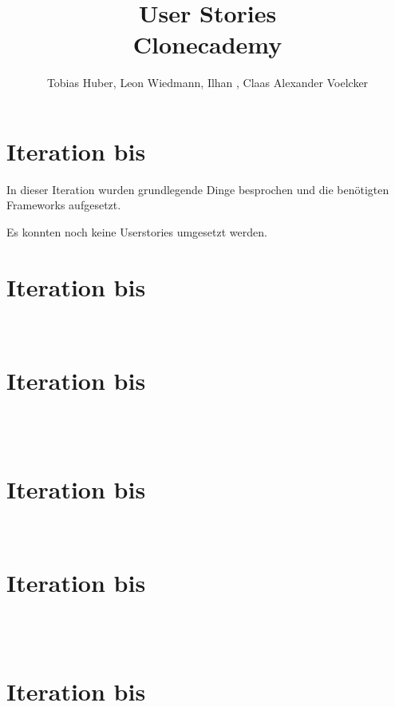 \documentclass
[english,accentcolor=tud1c]
{tudreport}
\title{User Stories\\Clonecademy}
\author{Tobias Huber, Leon Wiedmann, Ilhan , Claas Alexander Voelcker}
\begin{document}

	\maketitle

	\chapter{Iteration bis }
	In dieser Iteration wurden grundlegende Dinge besprochen und die benötigten Frameworks aufgesetzt.

	Es konnten noch keine Userstories umgesetzt werden. 

	\chapter{Iteration bis } %

	 \\
	


	\chapter{Iteration bis } %

	 \\
	 \\
	


	\chapter{Iteration bis } %

	 \\
	


	\chapter{Iteration bis } %

	\\
	\\
	

	\chapter{Iteration bis } %
\end{document}
